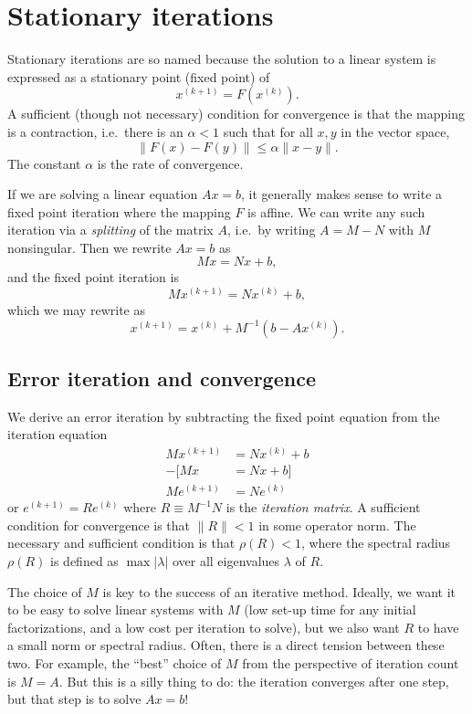 \section{Stationary iterations}

Stationary iterations are so named because the solution to a linear
system is expressed as a stationary point (fixed point) of
\[
  x^{(k+1)} = F(x^{(k)}).
\]
A sufficient (though not necessary) condition for convergence is that
the mapping is a contraction, i.e.~there is an $\alpha < 1$ such that
for all $x, y$ in the vector space,
\[
  \|F(x)-F(y)\| \leq \alpha \|x-y\|.
\]
The constant $\alpha$ is the rate of convergence.

If we are solving a linear equation $Ax = b$, it generally makes sense
to write a fixed point iteration where the mapping $F$ is affine.  We
can write any such iteration via a {\em splitting} of the matrix $A$,
i.e.~by writing $A=M-N$ with $M$ nonsingular.  Then we rewrite $Ax = b$
as
\[
  Mx = Nx + b,
\]
and the fixed point iteration is
\[
  Mx^{(k+1)} = Nx^{(k)} + b,
\]
which we may rewrite as
\[
  x^{(k+1)} = x^{(k)} + M^{-1} (b-Ax^{(k)}).
\]

\subsection{Error iteration and convergence}

We derive an error iteration by subtracting the fixed point equation
from the iteration equation
\begin{align*}
  M x^{(k+1)} &= Nx^{(k)} + b \\
  -[M x &= Nx + b] \\ \hline
  Me^{(k+1)} &= N e^{(k)}
\end{align*}
or $e^{(k+1)} = R e^{(k)}$ where $R \equiv M^{-1} N$ is
the {\em iteration matrix}.  A sufficient condition for convergence
is that $\|R\| < 1$ in some operator norm.  The necessary and sufficient
condition is that $\rho(R) < 1$, where the spectral radius $\rho(R)$
is defined as $\max |\lambda|$ over all eigenvalues $\lambda$ of $R$.

The choice of $M$ is key to the success of an iterative method.
Ideally, we want it to be easy to solve linear systems with $M$
(low set-up time for any initial factorizations, and a low cost
per iteration to solve), but we also want $R$ to have a small
norm or spectral radius.  Often, there is a direct tension between
these two.  For example, the ``best'' choice of $M$ from the perspective
of iteration count is $M = A$.  But this is a silly thing to do:
the iteration converges after one step, but that step is to solve
$Ax = b$!

